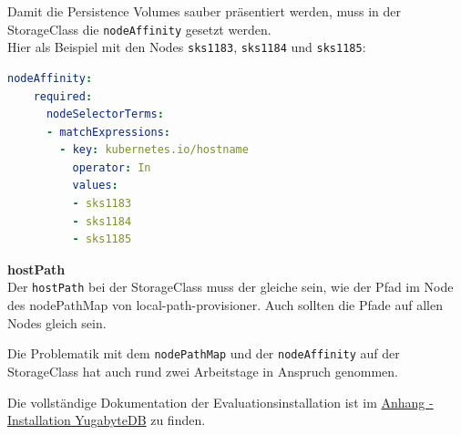 \begin{flushleft}
    Damit die Persistence Volumes sauber präsentiert werden, muss in der StorageClass die \texttt{nodeAffinity} gesetzt werden.\\
    Hier als Beispiel mit den Nodes \texttt{sks1183}, \texttt{sks1184} und \texttt{sks1185}:
\lstset{style=gra_codestyle}
\begin{lstlisting}[language=yaml, caption=yugabyteDB - StorageClass nodeAffinity,captionpos=b,label={lst:yugabytedb-storageclass_example},breaklines=true]
  nodeAffinity:
    required:
      nodeSelectorTerms:
      - matchExpressions:
        - key: kubernetes.io/hostname
          operator: In
          values:
          - sks1183
          - sks1184
          - sks1185
\end{lstlisting}
    \begin{warning}
        \textbf{hostPath}\\
        Der \texttt{hostPath} bei der StorageClass muss der gleiche sein, wie der Pfad im Node des nodePathMap von \gls{local-path-provisioner}.
        Auch sollten die Pfade auf allen Nodes gleich sein.
    \end{warning}
\end{flushleft}
\begin{flushleft}
    Die Problematik mit dem \texttt{nodePathMap} und der \texttt{nodeAffinity} auf der StorageClass hat auch rund zwei Arbeitstage in Anspruch genommen.
\end{flushleft}
\begin{flushleft}
    Die vollständige Dokumentation der Evaluationsinstallation ist im \hyperref[subsec:evaluation_installation_yugabytedb]{Anhang - Installation YugabyteDB} zu finden.
\end{flushleft}